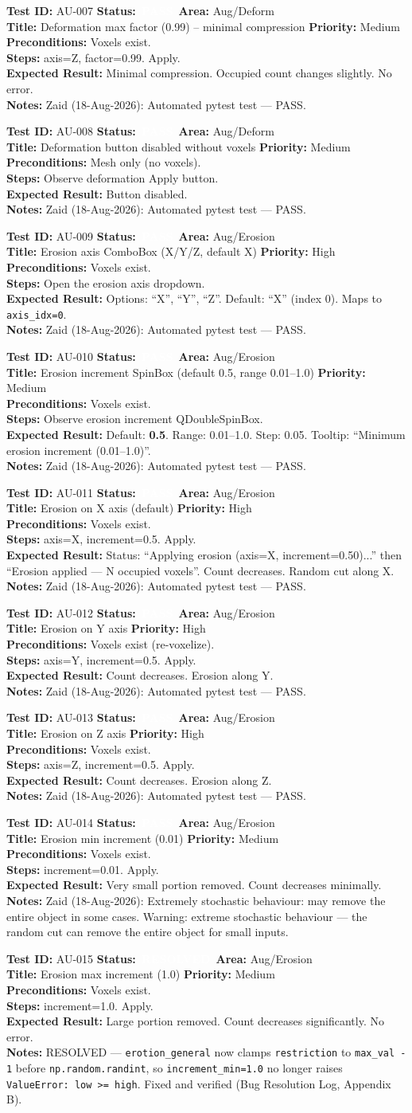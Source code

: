 \documentclass[12pt,a4paper]{article}
\newcommand{\statuspass}{\colorbox{statusgreen}{\textcolor{white}{\textbf{\,PASS\,}}}}
\newcommand{\statusresolved}{\colorbox{statusorange}{\textcolor{white}{\textbf{\,RESOLVED\,}}}}
\newcommand{\testcase}[9]{%
  \smallskip
  \noindent\textbf{Test ID:} #1 \hfill \textbf{Status:} #2 \hfill \textbf{Area:} #3 \\
  \textbf{Title:} #4 \hfill \textbf{Priority:} #5 \\[0.3em]
  \textbf{Preconditions:} #6 \\[0.3em]
  \textbf{Steps:} #7 \\[0.3em]
  \textbf{Expected Result:} #8 \\
  \textbf{Notes:} #9
  \smallskip
}
\begin{document}
\testcase{AU-007}{\statuspass}{Aug/Deform}{Deformation max factor (0.99) -- minimal compression}{Medium}{Voxels exist.}{axis=Z, factor=0.99. Apply.}{Minimal compression. Occupied count changes slightly. No error.}{Zaid (18-Aug-2026): Automated pytest test --- PASS.}


\testcase{AU-008}{\statuspass}{Aug/Deform}{Deformation button disabled without voxels}{Medium}{Mesh only (no voxels).}{Observe deformation Apply button.}{Button disabled.}{Zaid (18-Aug-2026): Automated pytest test --- PASS.}


\testcase{AU-009}{\statuspass}{Aug/Erosion}{Erosion axis ComboBox (X/Y/Z, default X)}{High}{Voxels exist.}{Open the erosion axis dropdown.}{Options: ``X'', ``Y'', ``Z''. Default: ``X'' (index 0). Maps to \texttt{axis\_idx=0}.}{Zaid (18-Aug-2026): Automated pytest test --- PASS.}


\testcase{AU-010}{\statuspass}{Aug/Erosion}{Erosion increment SpinBox (default 0.5, range 0.01--1.0)}{Medium}{Voxels exist.}{Observe erosion increment QDoubleSpinBox.}{Default: \textbf{0.5}. Range: 0.01--1.0. Step: 0.05. Tooltip: ``Minimum erosion increment (0.01--1.0)''.}{Zaid (18-Aug-2026): Automated pytest test --- PASS.}


\testcase{AU-011}{\statuspass}{Aug/Erosion}{Erosion on X axis (default)}{High}{Voxels exist.}{axis=X, increment=0.5. Apply.}{Status: ``Applying erosion (axis=X, increment=0.50)...'' then ``Erosion applied --- N occupied voxels''. Count decreases. Random cut along X.}{Zaid (18-Aug-2026): Automated pytest test --- PASS.}


\testcase{AU-012}{\statuspass}{Aug/Erosion}{Erosion on Y axis}{High}{Voxels exist (re-voxelize).}{axis=Y, increment=0.5. Apply.}{Count decreases. Erosion along Y.}{Zaid (18-Aug-2026): Automated pytest test --- PASS.}


\testcase{AU-013}{\statuspass}{Aug/Erosion}{Erosion on Z axis}{High}{Voxels exist.}{axis=Z, increment=0.5. Apply.}{Count decreases. Erosion along Z.}{Zaid (18-Aug-2026): Automated pytest test --- PASS.}


\testcase{AU-014}{\statuspass}{Aug/Erosion}{Erosion min increment (0.01)}{Medium}{Voxels exist.}{increment=0.01. Apply.}{Very small portion removed. Count decreases minimally.}{Zaid (18-Aug-2026): Extremely stochastic behaviour: may remove the entire object in some cases. Warning: extreme stochastic behaviour --- the random cut can remove the entire object for small inputs.}


\testcase{AU-015}{\statusresolved}{Aug/Erosion}{Erosion max increment (1.0)}{Medium}{Voxels exist.}{increment=1.0. Apply.}{Large portion removed. Count decreases significantly. No error.}{RESOLVED --- \texttt{erotion\_general} now clamps \texttt{restriction} to \texttt{max\_val - 1} before \texttt{np.random.randint}, so \texttt{increment\_min=1.0} no longer raises \texttt{ValueError: low >= high}. Fixed and verified (Bug Resolution Log, Appendix B).}
\end{document}
